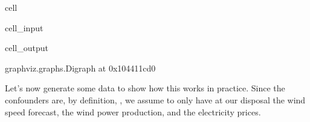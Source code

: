 \documentclass[letterpaper,10pt,english]{jupyterBook}
\begin{document}
\begin{sphinxuseclass}{cell}
\begin{sphinxVerbatimInput}
\begin{sphinxuseclass}{cell_input}
\end{sphinxuseclass}\end{sphinxVerbatimInput}
\begin{sphinxVerbatimOutput}

\begin{sphinxuseclass}{cell_output}
\begin{sphinxVerbatim}[commandchars=\\\{\}]
\PYGZlt{}graphviz.graphs.Digraph at 0x104411cd0\PYGZgt{}
\end{sphinxVerbatim}

\end{sphinxuseclass}\end{sphinxVerbatimOutput}

\end{sphinxuseclass}
\sphinxAtStartPar
Let’s now generate some data to show how this works in practice. Since the confounders are, by definition, , we assume to only have at our disposal the wind speed forecast, the wind power production, and the electricity prices.
\end{document}
